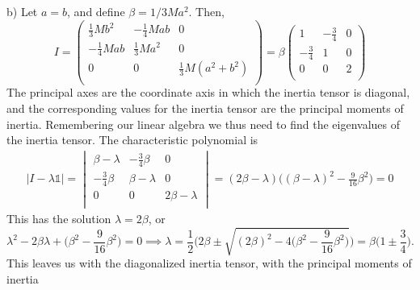 \documentclass{article}
\begin{document}
        b) Let $a = b$, and define $\beta = 1/3 Ma^2$. Then, 
        \begin{equation*}
            I =
            \begin{pmatrix}
                \frac{1}{3}Mb^2 & -\frac{1}{4}Mab & 0 \\
                -\frac{1}{4}Mab & \frac{1}{3}Ma^2 & 0 \\
                0 & 0 & \frac{1}{3}M(a^2 + b^2)   \\
            \end{pmatrix}
            = \beta
            \begin{pmatrix}
            1 & -\frac{3}{4}  & 0 \\
            -\frac{3}{4}  & 1 & 0 \\
            0 & 0 & 2  \\
            \end{pmatrix}
        \end{equation*}
        The principal axes are the coordinate axis in which the inertia tensor is diagonal, and the corresponding values for the inertia tensor are the principal moments of inertia. Remembering our linear algebra we thus need to find the eigenvalues of the inertia tensor. The characteristic polynomial is
        \begin{align*}
            |I - \lambda \mathbb{1} | = 
            \begin{vmatrix}
                \beta - \lambda & -\frac{3}{4} \beta  & 0 \\
                -\frac{3}{4}\beta  & \beta - \lambda & 0 \\
                0 & 0 & 2\beta - \lambda  \\
            \end{vmatrix}
            = (2\beta - \lambda)\bigg((\beta - \lambda)^2 - \frac{9}{16} \beta^2\bigg) = 0
        \end{align*}
        This has the solution $\lambda = 2\beta$, or
        \begin{equation*}
            \lambda^2 - 2 \beta \lambda + \bigg(\beta^2 - \frac{9}{16} \beta^2 \bigg) = 0 
            \implies \lambda = \frac{1}{2}\bigg( 2\beta \pm \sqrt{(2 \beta)^2 - 4 \bigg(\beta^2 - \frac{9}{16} \beta^2 \bigg)} \bigg) 
            = \beta \bigg(1 \pm \frac{3}{4}\bigg).
        \end{equation*}
        This leaves us with the diagonalized inertia tensor, with the principal moments of inertia
\end{document}
